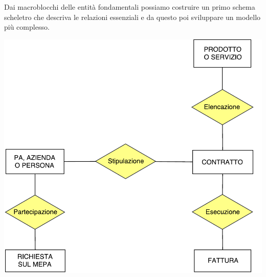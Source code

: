 Dai macroblocchi delle entità fondamentali possiamo costruire un primo schema scheletro che descriva le relazioni essenziali e da questo poi sviluppare un modello più complesso.\newline



\includegraphics[width=0.7\linewidth]{./immagini/schema_scheletro.pdf}

